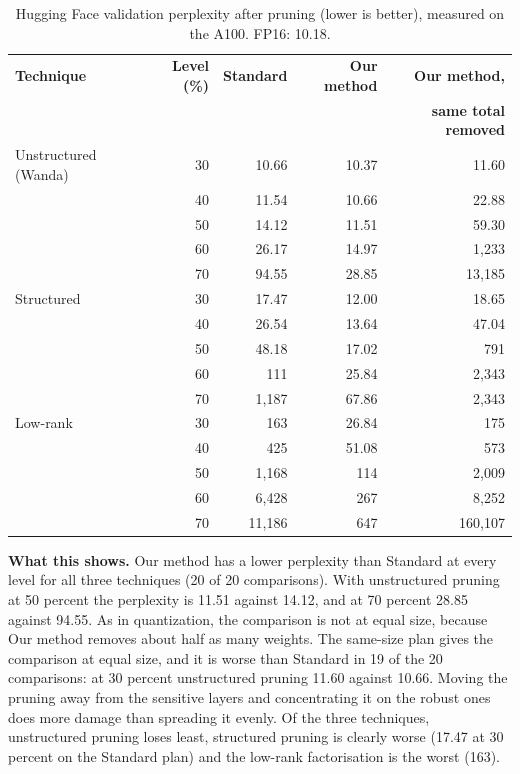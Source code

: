 \begin{table}[htbp]
\centering
\small
\caption{Hugging Face validation perplexity after pruning (lower is better), measured on the A100. FP16: 10.18.}
\label{tab:ch5-prune}
\renewcommand{\arraystretch}{1.1}
\begin{tabularx}{0.9\textwidth}{Xrrrr}
\hline
\textbf{Technique} & \textbf{Level (\%)} & \textbf{Standard} & \textbf{Our method} & \textbf{Our method,} \\
 & & & & \textbf{same total removed} \\
\hline
Unstructured (Wanda) & 30 & 10.66 & 10.37 & 11.60 \\
 & 40 & 11.54 & 10.66 & 22.88 \\
 & 50 & 14.12 & 11.51 & 59.30 \\
 & 60 & 26.17 & 14.97 & 1{,}233 \\
 & 70 & 94.55 & 28.85 & 13{,}185 \\
\hline
Structured & 30 & 17.47 & 12.00 & 18.65 \\
 & 40 & 26.54 & 13.64 & 47.04 \\
 & 50 & 48.18 & 17.02 & 791 \\
 & 60 & 111 & 25.84 & 2{,}343 \\
 & 70 & 1{,}187 & 67.86 & 2{,}343 \\
\hline
Low-rank & 30 & 163 & 26.84 & 175 \\
 & 40 & 425 & 51.08 & 573 \\
 & 50 & 1{,}168 & 114 & 2{,}009 \\
 & 60 & 6{,}428 & 267 & 8{,}252 \\
 & 70 & 11{,}186 & 647 & 160{,}107 \\
\hline
\end{tabularx}
\end{table}

\textbf{What this shows.} Our method has a lower perplexity than Standard at every level for all three techniques (20 of 20 comparisons). With unstructured pruning at 50 percent the perplexity is 11.51 against 14.12, and at 70 percent 28.85 against 94.55. As in quantization, the comparison is not at equal size, because Our method removes about half as many weights. The same-size plan gives the comparison at equal size, and it is worse than Standard in 19 of the 20 comparisons: at 30 percent unstructured pruning 11.60 against 10.66. Moving the pruning away from the sensitive layers and concentrating it on the robust ones does more damage than spreading it evenly. Of the three techniques, unstructured pruning loses least, structured pruning is clearly worse (17.47 at 30 percent on the Standard plan) and the low-rank factorisation is the worst (163).

